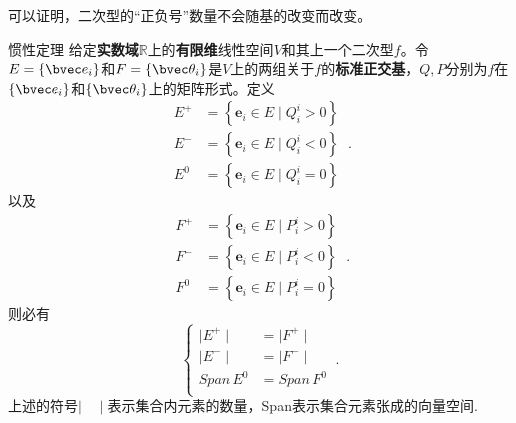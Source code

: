 可以证明，二次型的“正负号”数量不会随基的改变而改变。
\begin{theorem}{惯性定理}
给定\textbf{实数域}$\mathbb R$上的\textbf{有限维}线性空间$V$和其上一个二次型$f$。令$E=\{\bvec e_i\}$和$F=\{\bvec \theta_i\}$是$V$上的两组关于$f$的\textbf{标准正交基}，$Q,P$分别为$f$在$\{\bvec e_i\}$和$\{\bvec \theta_i\}$上的矩阵形式。定义
\begin{equation}
\begin{aligned}
E^{+} & =\left\{\mathbf{e}_i \in E \mid Q^i_i>0\right\} \\
E^{-} & =\left\{\mathbf{e}_i \in E \mid Q^i_i<0\right\} \\
E^0 & =\left\{\mathbf{e}_i \in E \mid Q^i_i=0\right\}
\end{aligned}~.
\end{equation}
以及
\begin{equation}
\begin{aligned}
F^{+} & =\left\{\mathbf{e}_i \in E \mid P^i_i>0\right\} \\
F^{-} & =\left\{\mathbf{e}_i \in E \mid P^i_i<0\right\} \\
F^0 & =\left\{\mathbf{e}_i \in E \mid P^i_i=0\right\}
\end{aligned}~.
\end{equation}
则必有
\begin{equation}
\left\{
\begin{aligned}
\mid E^{+}\mid&=\mid F^{+}\mid\\
\mid E^{-}\mid&=\mid F^{-}\mid\\
Span\, E^{0}&=Span\, F^{0}\\
\end{aligned}\right.~.
\end{equation}
上述的符号$\mid \quad\mid$表示集合内元素的数量，Span表示集合元素张成的向量空间.
\end{theorem}